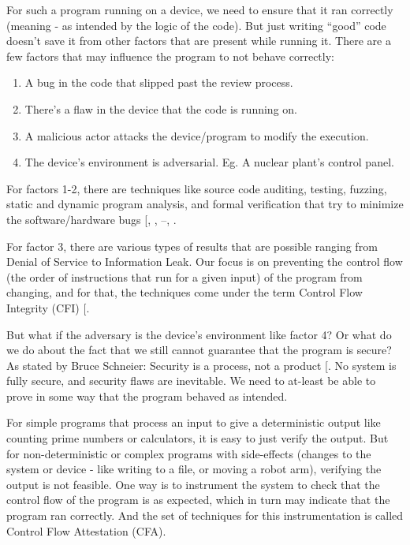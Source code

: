 \documentclass[a4paper, nobind]{templates/ociamthesis}
\providecommand{\tightlist}{%
  \setlength{\itemsep}{0pt}\setlength{\parskip}{0pt}}
\begin{document}
For such a program running on a device, we need to ensure that it ran correctly
(meaning - as intended by the logic of the code).
But just writing ``good'' code doesn't save it from other factors that are present while running it.
There are a few factors that may influence the program to not behave correctly:

\begin{enumerate}
\def\labelenumi{\arabic{enumi}.}
\tightlist
\item
  A bug in the code that slipped past the review process.
\item
  There's a flaw in the device that the code is running on.
\item
  A malicious actor attacks the device/program to modify the execution.
\item
  The device's environment is adversarial. Eg. A nuclear plant's control panel.
\end{enumerate}

For factors 1-2, there are techniques like source code auditing, testing,
fuzzing, static and dynamic program analysis, and formal verification that try
to minimize the software/hardware bugs {[}, , --, \citeproc{ref-quinlan2009source}{44}{]}.

For factor 3, there are various types of results that are possible ranging from
Denial of Service to Information Leak.
Our focus is on preventing the control flow (the order of instructions that run for a given input)
of the program from changing, and for that, the techniques come under the term
Control Flow Integrity (CFI) {[}\citeproc{ref-sok}{5}{]}.

But what if the adversary is the device's environment like factor 4?
Or what do we do about the fact that we still cannot guarantee that the program is secure?
As stated by Bruce Schneier: Security is a process, not a product {[}\citeproc{ref-bruceessay}{47}{]}.
No system is fully secure, and security flaws are inevitable.
We need to at-least be able to prove in some way that the program behaved as intended.

For simple programs that process an input to give a deterministic output like
counting prime numbers or calculators, it is easy to just verify the output.
But for non-deterministic or complex programs with side-effects (changes to the
system or device - like writing to a file, or moving a robot arm), verifying the
output is not feasible. One way is to instrument the system to check that the
control flow of the program is as expected, which in turn may indicate
that the program ran correctly.
And the set of techniques for this instrumentation is called Control Flow
Attestation (CFA).
\end{document}
